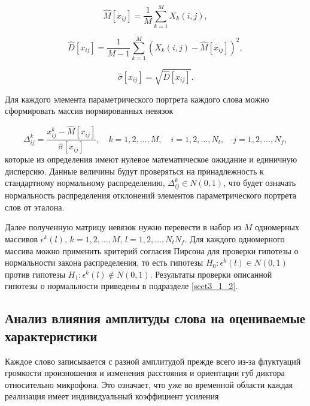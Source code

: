 \begin{equation} \label{eq:2_1_1_2}
\widehat{M}[x_{ij}] = \frac{1}{M} \sum_{k=1}^M X_k (i, j),
\end{equation}

\begin{equation} \label{eq:2_1_1_3}
\widehat{D}[x_{ij}] = \frac{1}{M - 1} \sum_{k=1}^M (X_k (i, j) - \widehat{M}[x_{ij}])^2,
\end{equation}

\begin{equation} \label{eq:2_1_1_4}
\widehat{\sigma}[x_{ij}] = \sqrt{\widehat{D}[x_{ij}]}.
\end{equation}

Для каждого элемента параметрического портрета каждого слова можно сформировать массив нормированных невязок

\begin{equation} \label{eq:2_1_1_5}
\Delta_{ij}^k = \frac{x_{ij}^k - \widehat{M}[x_{ij}]}{\widehat{\sigma}[x_{ij}]}, \quad
k = 1, 2, \dots, M, \quad
i = 1, 2, \dots, N_t, \quad
j = 1, 2, \dots, N_f,
\end{equation}
которые из определения имеют нулевое математическое ожидание и единичную дисперсию.
Данные величины будут проверяться на принадлежность к стандартному нормальному распределению, $\Delta_{ij}^k \in N(0, 1)$, что будет означать нормальность распределения отклонений элементов параметрического портрета слов от эталона.

Далее полученную матрицу невязок нужно перевести в набор из $M$ одномерных массивов $\epsilon^k (l)$, $k = 1, 2, \dots, M$, $l = 1, 2, \dots, N_t N_f$.
Для каждого одномерного массива можно применить критерий согласия Пирсона для проверки гипотезы о нормальности закона распределения, то есть гипотезы $H_0: \epsilon^k (l) \in N(0, 1)$ против гипотезы $H_1: \epsilon^k (l) \notin N(0, 1)$.
Результаты проверки описанной гипотезы о нормальности приведены в подразделе \ref{sect3_1_2}.


\subsection{Анализ влияния амплитуды слова на оцениваемые характеристики} \label{sect2_1_2}

Каждое слово записывается с разной амплитудой прежде всего из-за флуктуаций громкости произношения и изменения расстояния и ориентации губ диктора относительно микрофона.
Это означает, что уже во временной области каждая реализация имеет индивидуальный коэффициент усиления

